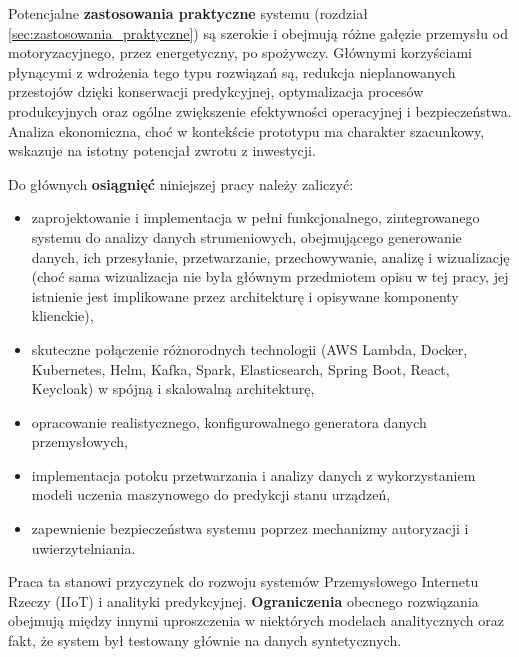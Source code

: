 Potencjalne \textbf{zastosowania praktyczne} systemu (rozdział \ref{sec:zastosowania_praktyczne}) są szerokie i obejmują różne gałęzie przemysłu od motoryzacyjnego, przez energetyczny, po spożywczy. Głównymi korzyściami płynącymi z wdrożenia tego typu rozwiązań są, redukcja nieplanowanych przestojów dzięki konserwacji predykcyjnej, optymalizacja procesów produkcyjnych oraz ogólne zwiększenie efektywności operacyjnej i bezpieczeństwa. Analiza ekonomiczna, choć w kontekście prototypu ma charakter szacunkowy, wskazuje na istotny potencjał zwrotu z inwestycji.


Do głównych \textbf{osiągnięć} niniejszej pracy należy zaliczyć:
\begin{itemize}
    \item zaprojektowanie i implementacja w pełni funkcjonalnego, zintegrowanego systemu do analizy danych  strumeniowych, obejmującego generowanie danych, ich przesyłanie, przetwarzanie, przechowywanie, analizę i wizualizację (choć sama wizualizacja nie była głównym przedmiotem opisu w tej pracy, jej istnienie jest implikowane przez architekturę i opisywane komponenty klienckie),
    \item skuteczne połączenie różnorodnych technologii (AWS Lambda, Docker, Kubernetes, Helm, Kafka, Spark, Elasticsearch, Spring Boot, React, Keycloak) w spójną i skalowalną architekturę,
    \item opracowanie realistycznego, konfigurowalnego generatora danych przemysłowych,
    \item implementacja potoku przetwarzania i analizy danych z wykorzystaniem modeli uczenia maszynowego do predykcji stanu urządzeń,
    \item zapewnienie bezpieczeństwa systemu poprzez mechanizmy autoryzacji i uwierzytelniania.
\end{itemize}

Praca ta stanowi przyczynek do rozwoju systemów Przemysłowego Internetu Rzeczy (IIoT) i analityki predykcyjnej. \textbf{Ograniczenia} obecnego rozwiązania obejmują między innymi uproszczenia w niektórych modelach analitycznych oraz fakt, że system był testowany głównie na danych syntetycznych. 

